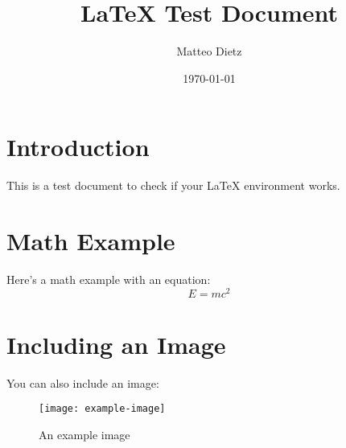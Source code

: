 \documentclass{article}
\title{LaTeX Test Document}
\author{Matteo Dietz}
\date{\today}
\begin{document}
\maketitle

\section{Introduction}
This is a test document to check if your LaTeX environment works.

\section{Math Example}
Here’s a math example with an equation:
\begin{equation}
    E = mc^2
\end{equation}

\section{Including an Image}
You can also include an image:
\begin{figure}[h]
    \centering
    \texttt{[image: example-image]}
    \caption{An example image}
\end{figure}
\end{document}
